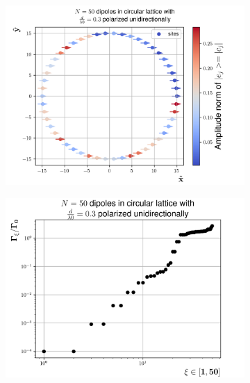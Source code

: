 \documentclass{article}
\begin{document}
\begin{figure}[H]
    \centering
    \begin{subfigure}[b]{0.49\textwidth}
        \includegraphics[width=\textwidth]{figs/dipoles_case_circular_unidirectional_lowest.png}
        \caption{}
        \label{fig:circular_lowest_eigenstate}
    \end{subfigure}
    \hfill
    \begin{subfigure}[b]{0.49\textwidth}
        \includegraphics[width=\textwidth]{figs/case_circular_unidirectional_d_03.png}
        \caption{}
        \label{fig:circular_unidirectional_decayrates}
    \end{subfigure}
    \caption{}
    \label{fig:circular}
\end{figure}
\end{document}
